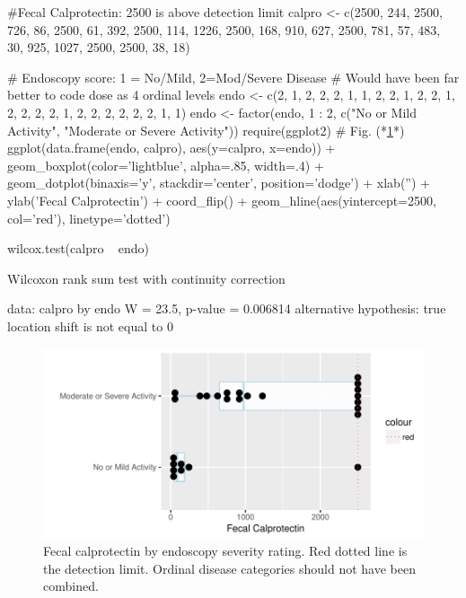 \begin{Schunk}
\begin{Sinput}
#Fecal Calprotectin: 2500 is above detection limit
calpro <- c(2500, 244, 2500, 726, 86, 2500, 61, 392, 2500, 114, 1226,
            2500, 168, 910, 627, 2500, 781, 57, 483, 30, 925, 1027,
            2500, 2500, 38, 18)

# Endoscopy score: 1 = No/Mild, 2=Mod/Severe Disease
# Would have been far better to code dose as 4 ordinal levels
endo <- c(2, 1, 2, 2, 2, 1, 1, 2, 2, 1, 2, 2, 1, 2, 2, 2, 2, 1, 2,
          2, 2, 2, 2, 2, 1, 1)
endo <- factor(endo, 1 : 2,
               c("No or Mild Activity", "Moderate or Severe Activity"))
require(ggplot2)   # Fig. (*\ref{fig:nonpar-calpro}*)
ggplot(data.frame(endo, calpro), aes(y=calpro, x=endo)) +
  geom_boxplot(color='lightblue', alpha=.85, width=.4) +
  geom_dotplot(binaxis='y', stackdir='center', position='dodge') +
    xlab('') + ylab('Fecal Calprotectin') + coord_flip() +
      geom_hline(aes(yintercept=2500, col='red'), linetype='dotted')
\end{Sinput}
\begin{Sinput}
wilcox.test(calpro ~ endo)
\end{Sinput}
\begin{Soutput}

	Wilcoxon rank sum test with continuity correction

data:  calpro by endo
W = 23.5, p-value = 0.006814
alternative hypothesis: true location shift is not equal to 0
\end{Soutput}
\begin{figure}[htbp]

\centerline{\includegraphics[width=\maxwidth]{nonpar-calpro-1} }

\caption[Fecal calprotectin by severity]{Fecal calprotectin by endoscopy severity rating. Red dotted line is the detection limit.  Ordinal disease categories should not have been combined.}\label{fig:nonpar-calpro}
\end{figure}
\end{Schunk}
